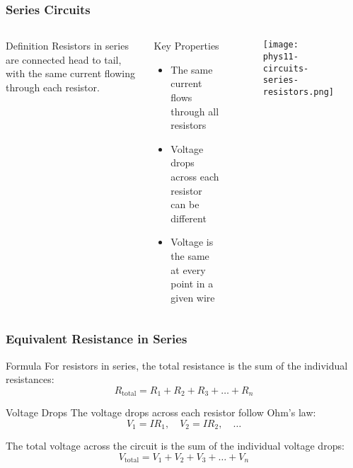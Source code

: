 \documentclass{beamer}
\begin{document}
\begin{frame}
    \frametitle{Series Circuits}
    \begin{columns}
        \begin{block}{Definition}
            Resistors in series are connected head to tail, with the same current flowing through each resistor.
        \end{block}
        
        \begin{block}{Key Properties}
            \begin{itemize}
                \item The same current flows through all resistors
                \item Voltage drops across each resistor can be different
                \item Voltage is the same at every point in a given wire
            \end{itemize}
        \end{block}
        
        \begin{alertblock}{ }
           \begin{figure}
               \centering
               \texttt{[image: phys11-circuits-series-resistors.png]}
           \end{figure}
        \end{alertblock}
    \end{columns}
\end{frame}

\begin{frame}
    \frametitle{Equivalent Resistance in Series}
    \begin{block}{Formula}
        For resistors in series, the total resistance is the sum of the individual resistances:
        \begin{equation}
            R_{\text{total}} = R_1 + R_2 + R_3 + \ldots + R_n
        \end{equation}
    \end{block}
    
    \begin{block}{Voltage Drops}
        The voltage drops across each resistor follow Ohm's law:
        \begin{equation}
            V_1 = IR_1, \quad V_2 = IR_2, \quad \ldots
        \end{equation}
        
        The total voltage across the circuit is the sum of the individual voltage drops:
        \begin{equation}
            V_{\text{total}} = V_1 + V_2 + V_3 + \ldots + V_n
        \end{equation}
    \end{block}
\end{frame}
\end{document}
